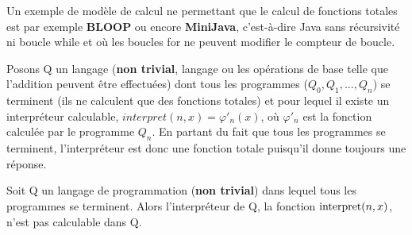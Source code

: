 \begin{myexem}
Un exemple de modèle de calcul ne permettant que le calcul de fonctions totales est par exemple \textbf{BLOOP} ou encore \textbf{MiniJava}, c'est-à-dire Java sans récursivité ni boucle while et où les boucles for ne peuvent modifier le compteur de boucle.
\end{myexem}

Posons Q un langage (\textbf{non trivial}, langage ou les opérations de base telle que l'addition peuvent être effectuées) dont tous les programmes ($Q_0, Q_1, ..., Q_n$) se terminent (ils ne calculent que des fonctions totales) et pour lequel il existe un interpréteur calculable, $interpret(n,x){} =\varphi'_n(x)$, où 
$\varphi'_n$ est la fonction calculée par le programme $Q_n$. En partant du fait que tous les programmes se terminent, l'interpréteur est donc une fonction totale puisqu'il donne toujours une réponse.

\begin{mytheo}
	\label{Hoare_Allison}
Soit Q un langage de programmation (\textbf{non trivial}) dans lequel tous les programmes se terminent.	Alors l'interpréteur de Q, la fonction $\operatorname{interpret}(n,x)$, n'est pas calculable dans Q.
\end{mytheo}

